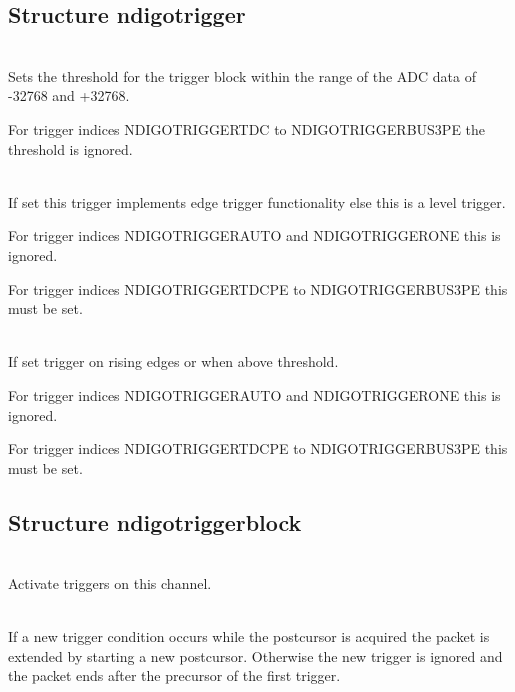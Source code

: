 		\subsection{Structure ndigo\tu trigger}
		
			\\
			Sets the threshold for the trigger block within the range of the ADC data of -32768 and +32768.\par

			For trigger indices \textsf{NDIGO\tu TRIGGER\tu TDC} to \textsf{NDIGO\tu TRIGGER\tu BUS3\tu PE} the threshold is ignored.\par

			\\
			If set this trigger implements edge trigger functionality else this is a level trigger.\par

			For trigger indices \textsf{NDIGO\tu TRIGGER\tu AUTO} and \textsf{NDIGO\tu TRIGGER\tu ONE} this is ignored.\par
			
			For trigger indices \textsf{NDIGO\tu TRIGGER\tu TDC\tu PE} to \textsf{NDIGO\tu TRIGGER\tu BUS3\tu PE} this must be set.\par
	
			\\
			If set trigger on rising edges or when above threshold.\par

			For trigger indices \textsf{NDIGO\tu TRIGGER\tu AUTO} and \textsf{NDIGO\tu TRIGGER\tu ONE} this is ignored.\par

			For trigger indices \textsf{NDIGO\tu TRIGGER\tu TDC\tu PE} to \textsf{NDIGO\tu TRIGGER\tu BUS3\tu PE} this must be set.
		
		\subsection{Structure ndigo\tu trigger\tu block\label{cp:triggerblock}}
		
		\\
		Activate triggers on this channel.\par

		\\
		If a new trigger condition occurs while the postcursor is acquired the packet is extended by starting a new postcursor. Otherwise the new trigger is ignored and the packet ends after the precursor of the first trigger.\par

